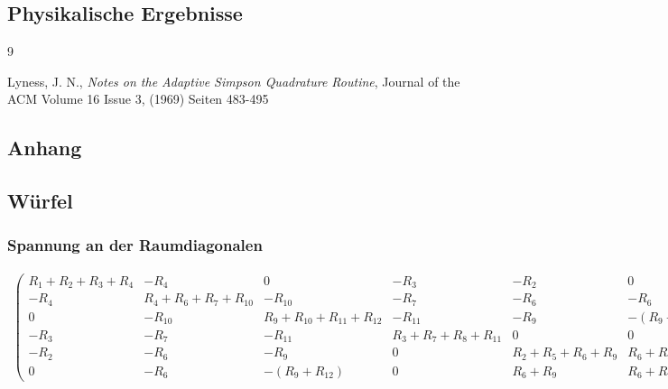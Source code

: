 \documentclass[10pt,a4paper]{article}
\begin{document}
\subsection{Physikalische Ergebnisse}
\begin{thebibliography}{9}

 Lyness, J. N.,
 \emph{Notes on the Adaptive Simpson Quadrature Routine},
Journal of the ACM
Volume 16 Issue 3, (1969) 
Seiten 483-495 

\end{thebibliography}
\begin{landscape}
\thispagestyle{empty}
\appendix
\section{Anhang}
\subsection{Würfel}
\subsubsection{Spannung an der Raumdiagonalen}
\begin{align}
\begin{pmatrix}
R_1+R_2+R_3+R_4 &  -R_4  &  0  &  -R_3  &  -R_2  &  0  \\ 
-R_4 & R_4+R_6+R_7+R_{10} & -R_{10} & -R_7 & -R_6 & -R_6 \\ 
 0  & -R_{10} & R_9+R_{10}+R_{11}+R_{12} & -R_{11} & -R_9 & -(R_9+R_{12}) \\ 
-R_3 & -R_7 & -R_11 & R_3+R_7+R_8+R_{11} & 0 & 0 \\ 
-R_2 & -R_6 & -R_9 & 0 & R_2+R_5+R_6+R_9 & R_6+R_9 \\ 
 0  & -R_6 & -(R_9+R_{12}) &  0  & R_6+R_9 & R_6+R_9+R_{12}
\end{pmatrix}
\begin{pmatrix}
I_1\\I_2\\I_3\\I_4\\I_5\\I_{ges}
\end{pmatrix}
=
\begin{pmatrix}
0\\0\\0\\0\\0\\U
\end{pmatrix}
\label{eqn:wuerfel_ganz}
\end{align}


\end{landscape}
\end{document}
